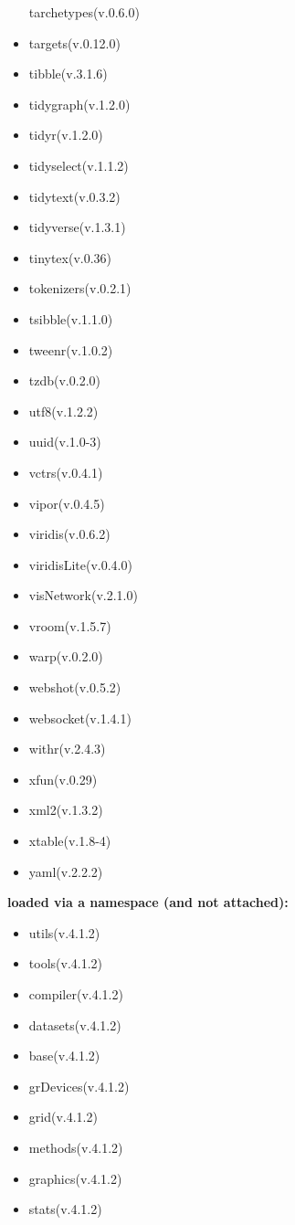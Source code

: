 \documentclass[
]{article}
\providecommand{\tightlist}{%
  \setlength{\itemsep}{0pt}\setlength{\parskip}{0pt}}
\begin{document}
\begin{itemize}
  tarchetypes(v.0.6.0)
\item
  targets(v.0.12.0)
\item
  tibble(v.3.1.6)
\item
  tidygraph(v.1.2.0)
\item
  tidyr(v.1.2.0)
\item
  tidyselect(v.1.1.2)
\item
  tidytext(v.0.3.2)
\item
  tidyverse(v.1.3.1)
\item
  tinytex(v.0.36)
\item
  tokenizers(v.0.2.1)
\item
  tsibble(v.1.1.0)
\item
  tweenr(v.1.0.2)
\item
  tzdb(v.0.2.0)
\item
  utf8(v.1.2.2)
\item
  uuid(v.1.0-3)
\item
  vctrs(v.0.4.1)
\item
  vipor(v.0.4.5)
\item
  viridis(v.0.6.2)
\item
  viridisLite(v.0.4.0)
\item
  visNetwork(v.2.1.0)
\item
  vroom(v.1.5.7)
\item
  warp(v.0.2.0)
\item
  webshot(v.0.5.2)
\item
  websocket(v.1.4.1)
\item
  withr(v.2.4.3)
\item
  xfun(v.0.29)
\item
  xml2(v.1.3.2)
\item
  xtable(v.1.8-4)
\item
  yaml(v.2.2.2)
\end{itemize}

\textbf{loaded via a namespace (and not attached):}

\begin{itemize}
\tightlist
\item
  utils(v.4.1.2)
\item
  tools(v.4.1.2)
\item
  compiler(v.4.1.2)
\item
  datasets(v.4.1.2)
\item
  base(v.4.1.2)
\item
  grDevices(v.4.1.2)
\item
  grid(v.4.1.2)
\item
  methods(v.4.1.2)
\item
  graphics(v.4.1.2)
\item
  stats(v.4.1.2)
\end{itemize}

\printbibliography
\end{document}
